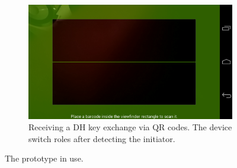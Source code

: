 \documentclass[conference, 11pt]{sty/IEEEtran}
\begin{document}
\begin{figure}
\begin{subfigure}{0.28\textwidth}
\includegraphics[width=\textwidth]{../screenshots/Screenshot_2013-12-01-20-51-38.png}
\caption{Receiving a DH key exchange via QR codes. The device switch roles after detecting the initiator.}
\end{subfigure}
\caption{The prototype in use.}
\end{figure}




\end{document}
